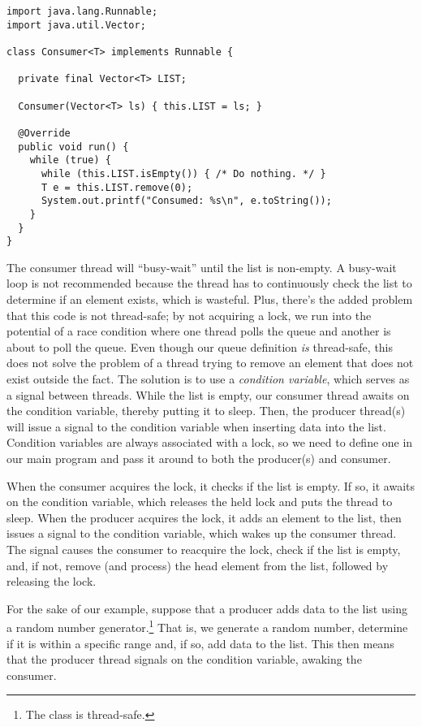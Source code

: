 \begin{lstlisting}[language=MyJava]
import java.lang.Runnable;
import java.util.Vector;

class Consumer<T> implements Runnable {

  private final Vector<T> LIST;

  Consumer(Vector<T> ls) { this.LIST = ls; }

  @Override
  public void run() {
    while (true) {
      while (this.LIST.isEmpty()) { /* Do nothing. */ }
      T e = this.LIST.remove(0);
      System.out.printf("Consumed: %s\n", e.toString());
    }
  }
}
\end{lstlisting}

The consumer thread will ``busy-wait'' until the list is non-empty. A busy-wait loop is not recommended because the thread has to continuously check the list to determine if an element exists, which is wasteful. Plus, there's the added problem that this code is not thread-safe; by not acquiring a lock, we run into the potential of a race condition where one thread polls the queue and another is about to poll the queue. Even though our queue definition \emph{is} thread-safe, this does not solve the problem of a thread trying to remove an element that does not exist outside the fact. The solution is to use a \emph{condition variable}, which serves as a signal between threads. While the list is empty, our consumer thread awaits on the condition variable, thereby putting it to sleep. Then, the producer thread(s) will issue a signal to the condition variable when inserting data into the list. Condition variables are always associated with a lock, so we need to define one in our main program and pass it around to both the producer(s) and consumer. 

When the consumer acquires the lock, it checks if the list is empty. If so, it awaits on the condition variable, which releases the held lock and puts the thread to sleep. When the producer acquires the lock, it adds an element to the list, then issues a signal to the condition variable, which wakes up the consumer thread. The signal causes the consumer to reacquire the lock, check if the list is empty, and, if not, remove (and process) the head element from the list, followed by releasing the lock.

For the sake of our example, suppose that a producer adds data to the list using a random number generator.\footnote{The  class is thread-safe.} That is, we generate a random number, determine if it is within a specific range and, if so, add data to the list. This then means that the producer thread signals on the condition variable, awaking the consumer.

